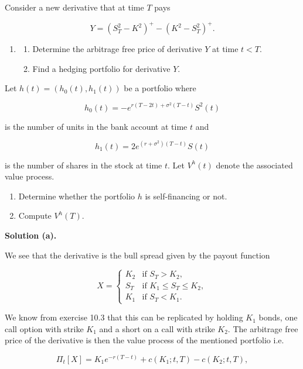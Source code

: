 \documentclass[
]{article}
\providecommand{\tightlist}{%
  \setlength{\itemsep}{0pt}\setlength{\parskip}{0pt}}
\begin{document}
Consider a new derivative that at time \(T\) pays

\[
Y=(S^2_T-K^2)^+-(K^2-S^2_T)^+.
\]

\begin{enumerate}
\def\labelenumi{\alph{enumi}.}
\setcounter{enumi}{1}
\item
  \begin{enumerate}
  \def\labelenumii{\roman{enumii}.}
  \tightlist
  \item
    Determine the arbitrage free price of derivative \(Y\) at time
    \(t<T\).
  \item
    Find a hedging portfolio for derivative \(Y\).
  \end{enumerate}
\end{enumerate}

Let \(h(t)=(h_0(t),h_1(t))\) be a portfolio where

\[
h_0(t)=-e^{r(T-2t)+\sigma^2(T-t)}S^2(t)
\]

is the number of units in the bank account at time \(t\) and

\[
h_1(t)=2e^{(r+\sigma^2)(T-t)}S(t)
\]

is the number of shares in the stock at time \(t\). Let \(V^h(t)\)
denote the associated value process.

\begin{enumerate}
\def\labelenumi{\alph{enumi}.}
\setcounter{enumi}{2}
\tightlist
\item
  Determine whether the portfolio \(h\) is self-financing or not.
\item
  Compute \(V^h(T)\).
\end{enumerate}

\textbf{Solution (a).}

We see that the derivative is the bull spread given by the payout
function

\[
X=
\begin{cases}
  K_2 & \text{if }S_T>K_2,\\
  S_T & \text{if }K_1\le S_T\le K_2,\\
  K_1 &\text{if }S_T< K_1.
\end{cases}
\]

We know from exercise 10.3 that this can be replicated by holding
\(K_1\) bonds, one call option with strike \(K_1\) and a short on a call
with strike \(K_2\). The arbitrage free price of the derivative is then
the value process of the mentioned portfolio i.e.

\[
\Pi_t[X]=K_1 e^{-r(T-t)}+c(K_1;t,T)-c(K_2;t,T),
\]
\end{document}
